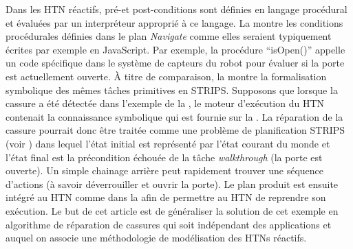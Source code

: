 \documentclass[a4paper,twoside,french]{article}
\begin{document}
		\par Dans les HTN réactifs, pré-et post-conditions sont définies en langage procédural et évaluées par un interpréteur approprié à ce langage. La  montre les  conditions procédurales définies dans le plan {\em Navigate} comme elles seraient typiquement écrites par exemple en JavaScript. Par exemple, la procédure ``isOpen()'' appelle un code spécifique dans le système de capteurs du robot pour évaluer si la porte est actuellement ouverte. À titre de comparaison, la  montre la formalisation symbolique des mêmes tâches primitives en STRIPS. 
		Supposons que lorsque la cassure a été détectée dans l'exemple de la , le moteur d'exécution du HTN contenait la connaissance symbolique qui est fournie sur la . La réparation de la cassure pourrait donc être traitée comme une problème de planification STRIPS (voir ) dans lequel l'état initial est représenté par l'état courant du monde et l'état final est la précondition échouée de la tâche {\em walkthrough} (la porte est ouverte). Un simple chainage arrière peut rapidement trouver une séquence d'actions (à savoir déverrouiller et ouvrir la porte). Le plan produit est ensuite intégré au HTN comme dans la  afin de permettre au HTN de reprendre son exécution.  Le but de cet article est de généraliser la solution de cet exemple en algorithme de réparation de cassures qui soit indépendant des applications et auquel on associe une méthodologie de modélisation des HTNs réactifs.
		
\end{document}
